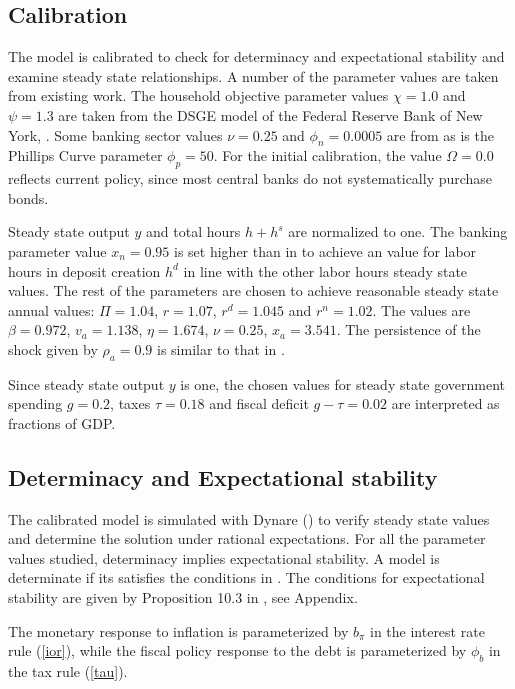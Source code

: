 \documentclass[]{article}
\begin{document}
\subsection{Calibration}

The model is calibrated to check for determinacy and expectational stability and examine steady state relationships. A number of the parameter values are taken from existing work. The household objective parameter values $\chi=1.0$ and $\psi=1.3$ are taken from the DSGE model of the Federal Reserve Bank of New York, \textcite{frbny_dsge_model}. Some banking sector values $\nu=0.25$ and $\phi_{n}=0.0005$ are from \textcite{ireland2014macroeconomics} as is the Phillips Curve parameter $\phi_{p}=50$. For the initial calibration, the value $\Omega=0.0$ reflects current policy, since most central banks do not systematically purchase bonds.

Steady state output $y$ and total hours $h+h^{s}$ are normalized to one. The banking parameter value $x_{n}=0.95$ is set higher than in \textcite{ireland2014macroeconomics} to achieve an value for labor hours in deposit creation $h^{d}$ in line with the other labor hours steady state values. The rest of the parameters are chosen to achieve reasonable steady state annual values: $\Pi=1.04$, $r=1.07$, $r^{d}=1.045$ and $r^{n}=1.02$. The values are $\beta=0.972$, $v_{a}=1.138$, $\eta=1.674$, $\nu=0.25$, $x_{a}=3.541$. The persistence of the shock given by $\rho_{a}=0.9$ is similar to that in \textcite{ireland2014macroeconomics}.

Since steady state output $y$ is one, the chosen values for steady state government spending $g=0.2$, taxes $\tau=0.18$ and fiscal deficit $g-\tau=0.02$ are interpreted as fractions of GDP. 

\subsection{Determinacy and Expectational stability}

The calibrated model is simulated with Dynare (\cite{adjemian2011dynare}) to verify steady state values and determine the solution under rational expectations. For all the parameter values studied, determinacy implies expectational stability. A model is determinate if its satisfies the conditions in  \textcite{blanchard1980solution}. The conditions for expectational stability are given by Proposition 10.3 in \textcite{evans2001learning}, see Appendix.

The monetary response to inflation is parameterized by $b_{\pi}$ in the interest rate rule (\ref{ior}), while the fiscal policy response to the debt is parameterized by $\phi_{b}$ in the tax rule (\ref{tau}).
\end{document}
